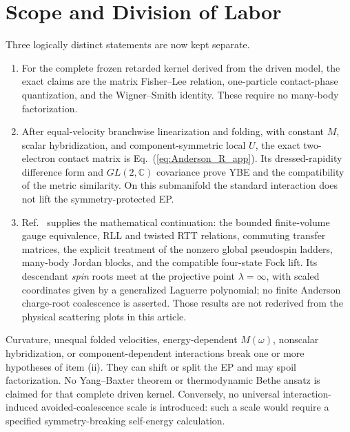 \documentclass[%
  aps,prb,reprint,amsmath,amssymb,superscriptaddress,longbibliography,floatfix
]{revtex4-2}
\begin{document}
\section{Scope and Division of Labor}
\label{app:YBE}

Three logically distinct statements are now kept separate.

\begin{enumerate}[label=(\roman*)]
\item For the complete frozen retarded kernel derived from the driven model,
the exact claims are the matrix Fisher--Lee relation, one-particle
contact-phase quantization, and the Wigner--Smith identity.  These require no
many-body factorization.

\item After equal-velocity branchwise linearization and folding, with
constant \(M\), scalar hybridization, and component-symmetric local \(U\),
the exact two-electron contact matrix is
Eq.~(\ref{eq:Anderson_R_app}).  Its dressed-rapidity difference form and
\(GL(2,\mathbb C)\) covariance prove YBE and the compatibility of the
metric similarity.  On this submanifold the standard interaction does
not lift the symmetry-protected EP.

\item Ref.~\cite{KulkarniYB2026} supplies the mathematical continuation:
the bounded finite-volume gauge equivalence, RLL and twisted RTT relations,
commuting transfer matrices, the explicit treatment of the nonzero global
pseudospin ladders, many-body Jordan blocks, and the compatible four-state
Fock lift.  Its descendant \emph{spin} roots meet at the
projective point \(\lambda=\infty\), with scaled coordinates given by a
generalized Laguerre polynomial; no finite Anderson charge-root coalescence
is asserted.  Those results are not rederived from the physical scattering
plots in this article.
\end{enumerate}

Curvature, unequal folded velocities, energy-dependent \(M(\omega)\),
nonscalar hybridization, or component-dependent interactions break one or
more hypotheses of item (ii).  They can shift or split the EP and may spoil
factorization.  No Yang--Baxter theorem or thermodynamic Bethe ansatz is
claimed for that complete driven kernel.  Conversely, no universal
interaction-induced avoided-coalescence scale is introduced: such a scale
would require a specified symmetry-breaking self-energy calculation.

\end{document}
